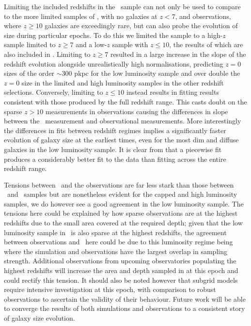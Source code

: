 Limiting the included redshifts in the \flares\ sample can not only be used to compare to the more limited samples of \bluetides, with no galaxies at $z<7$, and observations, where $z\geq10$ galaxies are exceedingly rare, but can also probe the evolution of size during particular epochs. To do this we limited the sample to a high-$z$ sample limited to $z\geq7$ and a low-$z$ sample with $z\leq10$, the results of which are also included in . Limiting to $z\geq7$ resulted in a large increase in the slope of the redshift evolution alongside unrealistically high normalisations, predicting $z=0$ sizes of the order $\sim300$ pkpc for the low luminosity sample and over double the $z=0$ size in the limited and high luminosity samples in the other redshift selections. Conversely, limiting to $z\leq10$ instead results in fitting results consistent with those produced by the full redshift range. This casts doubt on the sparse $z>10$ measurements in observations causing the differences in slope between the \flares\ measurement and observational measurements. More interestingly the differences in fits between redshift regimes implies a significantly faster evolution of galaxy size at the earliest times, even for the most dim and diffuse galaxies in the low luminosity sample. It is clear from  that a piecewise fit produces a considerably better fit to the data than fitting across the entire redshift range. 

Tensions between \flares\ and the observations are far less stark than those between \flares\ and \bluetides\ samples but are nonetheless evident for the capped and high luminosity samples, we do however see a good agreement in the low luminosity sample. The tensions here could be explained by how sparse observations are at the highest redshifts due to the small area covered at the required depth; given that the low luminosity sample in \flares\ is also sparse at the highest redshifts, the agreement between observations and \flares\ here could be due to this luminosity regime being where the simulation and observations have the largest overlap in sampling strength. Additional observations from upcoming observatories populating the highest redshifts will increase the area and depth sampled in at this epoch and could rectify this tension. It should also be noted however that subgrid models require intensive investigation at this epoch, with comparison to robust observations to ascertain the validity of their behaviour. Future work will be able to converge the results of both simulations and observations to a consistent story of galaxy size evolution. 


